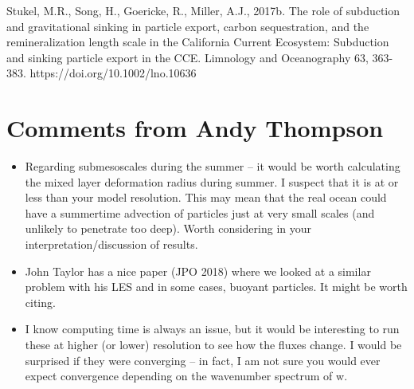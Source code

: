 \documentclass[12pt,letter]{article}
\begin{document}
Stukel, M.R., Song, H., Goericke, R., Miller, A.J., 2017b. The role of subduction and gravitational sinking in particle export, carbon sequestration, and the remineralization length scale in the California Current Ecosystem: Subduction and sinking particle export in the CCE. Limnology and Oceanography 63, 363-383. https://doi.org/10.1002/lno.10636\\


\section{Comments from Andy Thompson}
\begin{itemize}
	\item Regarding submesoscales during the summer -- it would be worth calculating the mixed layer deformation radius during summer.  I suspect that it is at or less than your model resolution.  This may mean that the real ocean could have a summertime advection of particles just at very small scales (and unlikely to penetrate too deep).  Worth considering in your interpretation/discussion of results.

	\item John Taylor has a nice paper (JPO 2018) where we looked at a similar problem with his LES and in some cases, buoyant particles. It might be worth citing.

	\item I know computing time is always an issue, but it would be interesting to run these at higher (or lower) resolution to see how the fluxes change.  I would be surprised if they were converging -- in fact, I am not sure you would ever expect convergence depending on the wavenumber spectrum of w.
\end{itemize}





\end{document}
